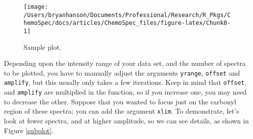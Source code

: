 \documentclass[letter,10pt,twocolumn,twoside,printwatermark=false]{pinp}
\begin{document}
\begin{Shaded}
\begin{Highlighting}[]
\StringTok{ }\NormalTok{(}
  \OperatorTok{~}
\StringTok{  }\OperatorTok{~}
\StringTok{  }\OperatorTok{~}\OperatorTok{~}
   \NormalTok{(}\NormalTok{, }\NormalTok{, }\NormalTok{, }\NormalTok{),}
   \NormalTok{(}\NormalTok{, }\NormalTok{),}
   \NormalTok{,}
   \NormalTok{)}
\end{Highlighting}
\end{Shaded}

\begin{figure}

{\centering \texttt{[image: /Users/bryanhanson/Documents/Professional/Research/R\_Pkgs/ChemoSpec/docs/articles/ChemoSpec\_files/figure-latex/Chunk8-1]} 

}

\caption{\label{plot}Sample plot.}\label{fig:Chunk8}
\end{figure}

Depending upon the intensity range of your data set, and the number of
spectra to be plotted, you have to manually adjust the arguments
\texttt{yrange}, \texttt{offset} and \texttt{amplify}, but this usually
only takes a few iterations. Keep in mind that \texttt{offset}, and
\texttt{amplify} are multiplied in the function, so if you increase one,
you may need to decrease the other. Suppose that you wanted to focus
just on the carbonyl region of these spectra; you can add the argument
\texttt{xlim}. To demonstrate, let's look at fewer spectra, and at
higher amplitude, so we can see details, as shown in Figure
\ref{subplot}.

\begin{Shaded}
\begin{Highlighting}[]
   \NormalTok{(}\NormalTok{, }\NormalTok{, }\NormalTok{, }\NormalTok{),}
   \NormalTok{(}\NormalTok{, }\NormalTok{),}
   \NormalTok{,}
   \NormalTok{,}
   \NormalTok{(}\NormalTok{, }\NormalTok{))}
\end{Highlighting}
\end{Shaded}
\end{document}
